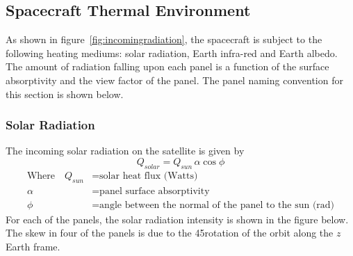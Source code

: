 \begin{figure}[H]
\end{figure}



\subsection{Spacecraft Thermal Environment}
As shown in figure~\ref{fig:incomingradiation}, the spacecraft is subject to the following heating mediums: solar radiation, Earth infra-red and Earth albedo. The amount of radiation falling upon each panel is a function of the surface absorptivity and the view factor of the panel. The panel naming convention for this section is shown below.

\subsubsection{Solar Radiation}
The incoming solar radiation on the satellite is given by
\begin{equation}
    Q_{solar} = Q_{sun}\,\alpha\cos\phi
\end{equation}
\vspace{-1cm}
\begin{align}
\text{Where}\quad Q_{sun} &= \text{solar heat flux (Watts)} \nonumber\\
\alpha &= \text{panel surface absorptivity} \nonumber\\
\phi &= \text{angle between the normal of the panel to the sun (rad)} \nonumber
\end{align}
\noindent
For each of the panels, the solar radiation intensity is shown in the figure below. The skew in four of the panels is due to the 45\deg rotation of the orbit along the $z$ Earth frame.

\begin{figure}[H]
\end{figure}

